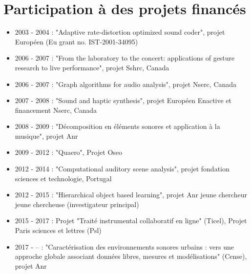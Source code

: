 \section{Participation à des projets financés}
\begin{itemize}
\item 2003 - 2004 : "Adaptive rate-distortion optimized sound coder", projet Européen (Eu grant no. IST-2001-34095)
\item 2006 - 2007 : "From the laboratory to the concert: applications of gesture research to live performance", projet Sshrc, Canada
\item 2006 - 2007 : "Graph algorithms for audio analysis", projet Nserc, Canada
\item 2007 - 2008 : "Sound and haptic synthesis", projet Européen Enactive et financement Nserc, Canada
\item 2008 - 2009 : "Décomposition en éléments sonores et application à la musique", projet Anr
\item 2009 - 2012 : "Quaero", Projet Oseo
\item 2012 - 2014 : "Computational auditory scene analysis", projet fondation sciences et technologie, Portugal
\item 2012 - 2015 : "Hierarchical object based learning", projet Anr jeune chercheur jeune chercheuse (investigateur principal)
\item 2015 - 2017 : Projet "Traité instrumental collaboratif en ligne" (Ticel), Projet Paris sciences et lettres (Psl)
\item 2017 - -- : "Caractérisation des environnements sonores urbains : vers une approche globale associant données libres, mesures et modélisations" (Cense), projet Anr
\end{itemize}
